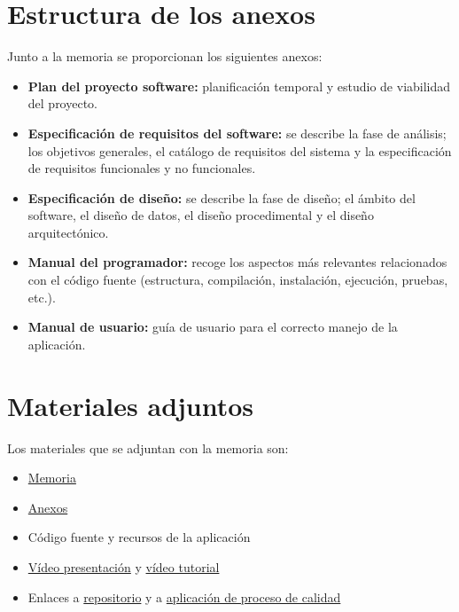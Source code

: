 \section{Estructura de los anexos}
Junto a la memoria se proporcionan los siguientes anexos:
\begin{itemize}
    \item \textbf{Plan del proyecto software: }planificación temporal y estudio de viabilidad del proyecto.
    \item \textbf{Especificación de requisitos del software: }se describe la fase de análisis; los objetivos generales, el catálogo de requisitos del sistema y la especificación de requisitos funcionales y no funcionales.
    \item \textbf{Especificación de diseño: }se describe la fase de diseño; el ámbito del software, el diseño de datos, el diseño procedimental y el diseño arquitectónico.
    \item \textbf{Manual del programador: }recoge los aspectos más relevantes relacionados con el código fuente (estructura, compilación, instalación, ejecución, pruebas, etc.).
    \item \textbf{Manual de usuario: }guía de usuario para el correcto manejo de la aplicación.
\end{itemize}

\section{Materiales adjuntos}

Los materiales que se adjuntan con la memoria son:

\begin{itemize}
    \item \href{https://github.com/jrp1004/CrowsFoot_JuanRomera_TFG/blob/main/doc/memoria.pdf}{Memoria}
    \item \href{https://github.com/jrp1004/CrowsFoot_JuanRomera_TFG/blob/main/doc/anexos.pdf}{Anexos}
    \item Código fuente y recursos de la aplicación
    \item \href{https://youtu.be/T2nNVw-jpxs}{Vídeo presentación} y \href{https://youtu.be/9sgKkoIIZ0U}{vídeo tutorial}
    \item Enlaces a \href{https://github.com/jrp1004/CrowsFoot_JuanRomera_TFG}{repositorio} y a \href{https://sonarcloud.io/project/overview?id=jrp1004_CrowsFoot_JuanRomera_TFG}{aplicación de proceso de calidad}
\end{itemize}